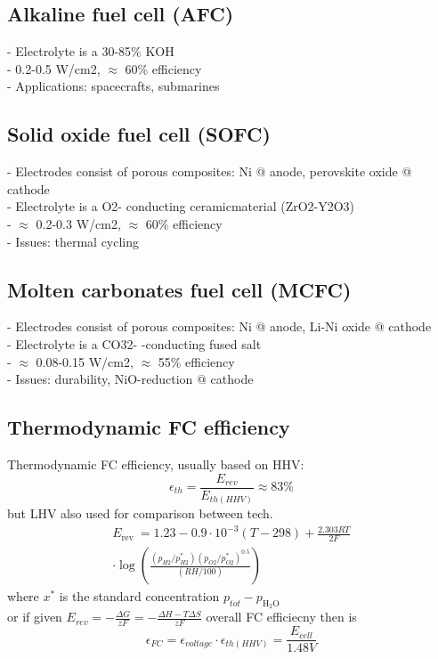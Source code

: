 \documentclass[a4paper,10pt,landscape]{scrartcl}
\begin{document}
\begin{multicols*}{3}
\subsection{Alkaline fuel cell (AFC)}
- Electrolyte is a 30-85\% KOH \\
- 0.2-0.5 W/cm2, $\approx$ 60\% efficiency \\
- Applications: spacecrafts, submarines
\subsection{Solid oxide fuel cell (SOFC)}
- Electrodes consist of porous composites: Ni @ anode, perovskite oxide @ cathode \\
- Electrolyte is a O2- conducting ceramicmaterial (ZrO2-Y2O3) \\
-  $\approx$ 0.2-0.3 W/cm2, $\approx$ 60\% efficiency \\
- Issues: thermal cycling
\subsection{Molten carbonates fuel cell (MCFC)}
- Electrodes consist of porous composites:
Ni @ anode, Li-Ni oxide @ cathode \\
- Electrolyte is a CO32- -conducting fused salt \\
- $\approx$ 0.08-0.15 W/cm2, $\approx$ 55\% efficiency \\
- Issues: durability, NiO-reduction @ cathode

\subsection{Thermodynamic FC efficiency}
Thermodynamic FC efficiency, usually based on HHV:
$$\epsilon_{th} = \frac{E_{rev}}{E_{th(HHV)}}\approx 83\%$$
but LHV also used for comparison between tech.
\begin{align*}
    E_{\text {rev }}=1.23-0.9 \cdot 10^{-3}(T-298)+\frac{2.303 R T}{2 F} \\
    \cdot\log \left(\frac{\left(p_{H 2} / p_{H 2}^*\right)\left(p_{O 2} / p_{O 2}^*\right)^{0.5}}{(R H / 100)}\right)
\end{align*}
where $x^*$ is the standard concentration $p_{tot}-p_\mathrm{H_2O}$ \\
or if given $E_{rev}=-\frac{\Delta G}{zF}=-\frac{\Delta H-T\Delta S}{zF}$
overall FC efficiecny then is
$$\epsilon_{FC}=\epsilon_{voltage}\cdot \epsilon_{th(HHV)}= \frac{E_{cell}}{1.48 V}$$


\end{multicols*}
\end{document}
